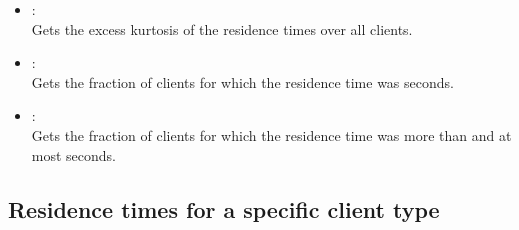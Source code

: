 \begin{itemize}
\item
{}:\\
Gets the excess kurtosis of the residence times over all clients.

\item
{}:\\
Gets the fraction of clients for which the residence time was  seconds.

\item
{}:\\
Gets the fraction of clients for which the residence time was more than  and at most  seconds.

\end{itemize}  



\subsection{Residence times for a specific client type}

